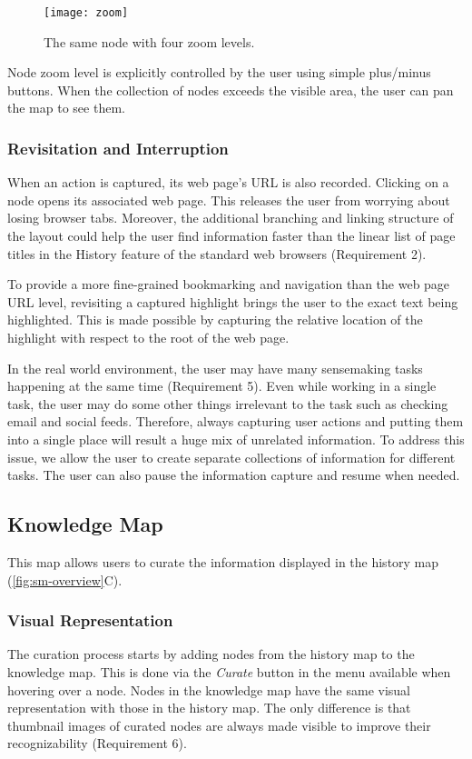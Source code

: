 \begin{figure}
	\centering
	\texttt{[image: zoom]}
	\caption{The same node with four zoom levels.}
	\label{fig:zoom}
\end{figure}

Node zoom level is explicitly controlled by the user using simple plus/minus buttons. When the collection of nodes exceeds the visible area, the user can pan the map to see them.

\subsubsection{Revisitation and Interruption}
When an action is captured, its web page's URL is also recorded. Clicking on a node opens its associated web page. This releases the user from worrying about losing browser tabs. Moreover, the additional branching and linking structure of the layout could help the user find information faster than the linear list of page titles in the History feature of the standard web browsers (Requirement 2).

To provide a more fine-grained bookmarking and navigation than the web page URL level, revisiting a captured highlight brings the user to the exact text being highlighted. This is made possible by capturing the relative location of the highlight with respect to the root of the web page.

In the real world environment, the user may have many sensemaking tasks happening at the same time (Requirement 5). Even while working in a single task, the user may do some other things irrelevant to the task such as checking email and social feeds. Therefore, always capturing user actions and putting them into a single place will result a huge mix of unrelated information. To address this issue, we allow the user to create separate collections of information for different tasks. The user can also pause the information capture and resume when needed.

\subsection{Knowledge Map}
This map allows users to curate the information displayed in the history map (\autoref{fig:sm-overview}C).

\subsubsection{Visual Representation}
The curation process starts by adding nodes from the history map to the knowledge map. This is done via the \textit{Curate} button in the menu available when hovering over a node. Nodes in the knowledge map have the same visual representation with those in the history map. The only difference is that thumbnail images of curated nodes are always made visible to improve their recognizability (Requirement 6).

